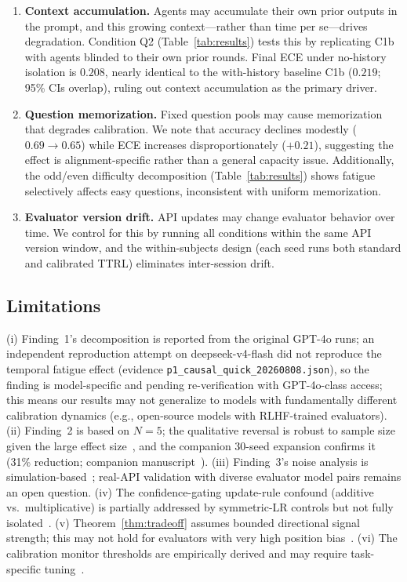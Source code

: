 \documentclass[11pt]{article}
\theoremstyle{definition}
\theoremstyle{remark}
\begin{document}
\begin{enumerate}[leftmargin=*,nosep]
    \item \textbf{Context accumulation.} Agents may accumulate their own prior outputs in the prompt, and this growing context---rather than time per se---drives degradation. Condition Q2 (Table~\ref{tab:results}) tests this by replicating C1b with agents blinded to their own prior rounds. Final ECE under no-history isolation is $0.208$, nearly identical to the with-history baseline C1b ($0.219$; 95\% CIs overlap), ruling out context accumulation as the primary driver.
    \item \textbf{Question memorization.} Fixed question pools may cause memorization that degrades calibration. We note that accuracy declines modestly ($0.69 \to 0.65$) while ECE increases disproportionately ($+0.21$), suggesting the effect is alignment-specific rather than a general capacity issue. Additionally, the odd/even difficulty decomposition (Table~\ref{tab:results}) shows fatigue selectively affects easy questions, inconsistent with uniform memorization.
    \item \textbf{Evaluator version drift.} API updates may change evaluator behavior over time. We control for this by running all conditions within the same API version window, and the within-subjects design (each seed runs both standard and calibrated TTRL) eliminates inter-session drift.
\end{enumerate}

\subsection{Limitations}

(i) Finding~1's decomposition is reported from the original GPT-4o runs; an independent reproduction attempt on deepseek-v4-flash did not reproduce the temporal fatigue effect (evidence \texttt{p1\_causal\_quick\_20260808.json}), so the finding is model-specific and pending re-verification with GPT-4o-class access; this means our results may not generalize to models with fundamentally different calibration dynamics (e.g., open-source models with RLHF-trained evaluators). (ii) Finding~2 is based on $N{=}5$; the qualitative reversal is robust to sample size given the large effect size~\citep{lehmann1998theory}, and the companion 30-seed expansion confirms it (31\% reduction; companion manuscript~\citep{companion2026}). (iii) Finding~3's noise analysis is simulation-based~\citep{resampling2026}; real-API validation with diverse evaluator model pairs remains an open question. (iv) The confidence-gating update-rule confound (additive vs.\ multiplicative) is partially addressed by symmetric-LR controls but not fully isolated~\citep{boundarysync2026}. (v) Theorem~\ref{thm:tradeoff} assumes bounded directional signal strength; this may not hold for evaluators with very high position bias~\citep{tversky1974anchoring}. (vi) The calibration monitor thresholds are empirically derived and may require task-specific tuning~\citep{naeini2015obtaining,jiang2021can}.
\end{document}
